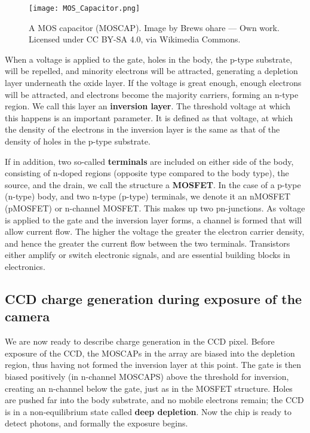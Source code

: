 \documentclass[../main.tex]{subfiles}
\begin{document}
	\begin{figure}[h!]
		\centering
		\texttt{[image: MOS\_Capacitor.png]}
		\caption{A MOS capacitor (MOSCAP). Image by Brews ohare — Own work. Licensed under CC BY-SA 4.0, via Wikimedia Commons.
		}
		\label{fig:mosfet}
	\end{figure}
	When a voltage is applied to the gate, holes in the body, the p-type substrate, will be repelled, and minority electrons will be attracted, generating a depletion layer underneath the oxide layer. If the voltage is great enough, enough electrons will be attracted, and electrons become the majority carriers, forming an n-type region. We call this layer an \textbf{inversion layer}. The threshold voltage at which this happens is an important parameter. It is defined as that voltage, at which the density of the electrons in the inversion layer is the same as that of the density of holes in the p-type substrate. 
	
	If in addition, two so-called \textbf{terminals} are included on either side of the body, consisting of n-doped regions (opposite type compared to the body type), the source, and the drain, we call the structure a \textbf{MOSFET}. In the case of a p-type (n-type) body, and two n-type (p-type) terminals, we denote it an nMOSFET (pMOSFET)  or n-channel MOSFET. This makes up two pn-junctions. As voltage is applied to the gate and the inversion layer forms, a channel is formed that will allow current flow. The higher the voltage the greater the electron carrier density, and hence the greater the current flow between the two terminals. Transistors either amplify or switch electronic signals, and are essential building blocks in electronics. 
	
	\subsection{CCD charge generation during exposure of the camera}
	We are now ready to describe charge generation in the CCD pixel. Before exposure of the CCD, the MOSCAPs in the array are biased into the depletion region, thus having not formed the inversion layer at this point. The gate is then biased positively (in n-channel MOSCAPS) above the threshold for inversion, creating an n-channel below the gate, just as in the MOSFET structure. Holes are pushed far into the body substrate, and no mobile electrons remain; the CCD is in a non-equilibrium state called \textbf{deep depletion}. Now the chip is ready to detect photons, and formally the exposure begins. 
	
\end{document}
